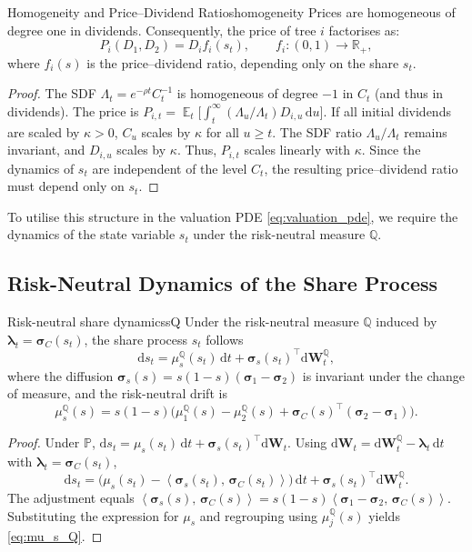 ﻿\documentclass[11pt,letterpaper,oneside]{article}
\numberwithin{equation}{section}
\DeclareMathOperator{\E}{\mathbb{E}}
\newcommand{\R}{\mathbb{R}}
\newcommand{\1}{\mathbf{1}}
\newcommand{\diff}{\mathrm{d}}
\newcommand{\ip}[2]{\left\langle #1,\,#2\right\rangle}
\begin{document}
\begin{proposition}{Homogeneity and Price--Dividend Ratios}{homogeneity}
Prices are homogeneous of degree one in dividends. Consequently, the price of tree $i$ factorises as:
\begin{equation}\label{eq:pd_ratio}
  P_i(D_1,D_2) = D_i f_i(s_t), \qquad f_i:(0,1)\to\R_+,
\end{equation}
where $f_i(s)$ is the price--dividend ratio, depending only on the share $s_t$.
\end{proposition}
\begin{proof}
The SDF $\Lambda_t=e^{-\rho t}C_t^{-1}$ is homogeneous of degree $-1$ in $C_t$ (and thus in dividends). The price is $P_{i,t} = \E_t\big[\int_t^\infty (\Lambda_u/\Lambda_t) D_{i,u}\,\diff u\big]$. If all initial dividends are scaled by $\kappa>0$, $C_u$ scales by $\kappa$ for all $u\ge t$. The SDF ratio $\Lambda_u/\Lambda_t$ remains invariant, and $D_{i,u}$ scales by $\kappa$. Thus, $P_{i,t}$ scales linearly with $\kappa$. Since the dynamics of $s_t$ are independent of the level $C_t$, the resulting price--dividend ratio must depend only on $s_t$.
\end{proof}

To utilise this structure in the valuation PDE \eqref{eq:valuation_pde}, we require the dynamics of the state variable $s_t$ under the risk-neutral measure $\mathbb{Q}$.

\subsection{Risk-Neutral Dynamics of the Share Process}

\begin{lemma}{Risk-neutral share dynamics}{sQ}
Under the risk-neutral measure $\mathbb{Q}$ induced by $\bm{\lambda}_t=\bm{\sigma}_C(s_t)$, the share process $s_t$ follows
\begin{equation}\label{eq:s_drift_Q}
  \diff s_t = \mu_s^{\mathbb{Q}}(s_t)\,\diff t + \bm{\sigma}_s(s_t)^{\top}\diff\bm{W}_t^{\mathbb{Q}},
\end{equation}
where the diffusion $\bm{\sigma}_s(s)=s(1-s)(\bm{\sigma}_1-\bm{\sigma}_2)$ is invariant under the change of measure, and the risk-neutral drift is
\begin{equation}\label{eq:mu_s_Q}
  \mu_s^{\mathbb{Q}}(s) = s(1-s)\Big(\mu_1^{\mathbb{Q}}(s)-\mu_2^{\mathbb{Q}}(s)+\bm{\sigma}_C(s)^{\top}(\bm{\sigma}_2-\bm{\sigma}_1)\Big).
\end{equation}
\end{lemma}
\begin{proof}
Under $\mathbb{P}$, $\diff s_t = \mu_s(s_t)\,\diff t + \bm{\sigma}_s(s_t)^{\top}\diff\bm{W}_t$. Using $\diff\bm{W}_t = \diff\bm{W}_t^{\mathbb{Q}} - \bm{\lambda}_t\,\diff t$ with $\bm{\lambda}_t=\bm{\sigma}_C(s_t)$,
\[
  \diff s_t = \big(\mu_s(s_t) - \ip{\bm{\sigma}_s(s_t)}{\bm{\sigma}_C(s_t)}\big)\,\diff t + \bm{\sigma}_s(s_t)^{\top}\diff\bm{W}_t^{\mathbb{Q}}.
\]
The adjustment equals $\ip{\bm{\sigma}_s(s)}{\bm{\sigma}_C(s)} = s(1-s)\ip{\bm{\sigma}_1-\bm{\sigma}_2}{\bm{\sigma}_C(s)}$. Substituting the expression for $\mu_s$ and regrouping using $\mu_j^{\mathbb{Q}}(s)$ yields \eqref{eq:mu_s_Q}.
\end{proof}
\end{document}
